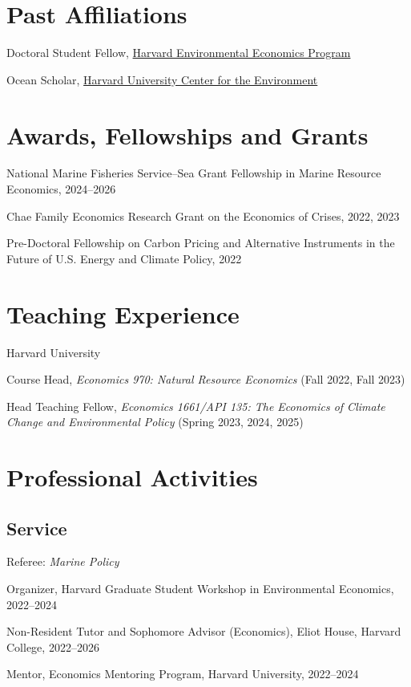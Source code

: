 \documentclass[10pt,letterpaper]{article}
\renewenvironment{itemize}{
  \begin{list}{}{
    \setlength{\leftmargin}{1.5em}
    \setlength{\topsep}{3pt}
    \setlength{\itemsep}{3pt}
    \setlength{\parsep}{0pt}
  }
}{
  \end{list}
}
\begin{document}
\section*{Past Affiliations}
\begin{itemize}
  \item Doctoral Student Fellow, \href{https://heep.hks.harvard.edu/people/people-terms/pre-doctoral-fellows}{Harvard Environmental Economics Program}
  \item Ocean Scholar, \href{https://www.oceanscholars.org/}{Harvard University Center for the Environment}
\end{itemize}

\section*{Awards, Fellowships and Grants}
\begin{itemize}
  \item National Marine Fisheries Service--Sea Grant Fellowship in Marine Resource Economics, 2024--2026
  \item Chae Family Economics Research Grant on the Economics of Crises, 2022, 2023
  \item Pre-Doctoral Fellowship on Carbon Pricing and Alternative Instruments in the Future of U.S. Energy and Climate Policy, 2022
\end{itemize}

\section*{Teaching Experience}
Harvard University
\begin{itemize}
  \item Course Head, \textit{Economics 970: Natural Resource Economics} (Fall 2022, Fall 2023)
  \item Head Teaching Fellow, \textit{Economics 1661/API 135: The Economics of Climate Change and Environmental Policy} (Spring 2023, 2024, 2025)
\end{itemize}

\section*{Professional Activities}
\subsection*{Service}
\begin{itemize}
  \item Referee: \textit{Marine Policy}
  \item Organizer, Harvard Graduate Student Workshop in Environmental Economics, 2022--2024
  \item Non-Resident Tutor and Sophomore Advisor (Economics), Eliot House, Harvard College, 2022--2026
  \item Mentor, Economics Mentoring Program, Harvard University, 2022--2024
\end{itemize}
\end{document}
